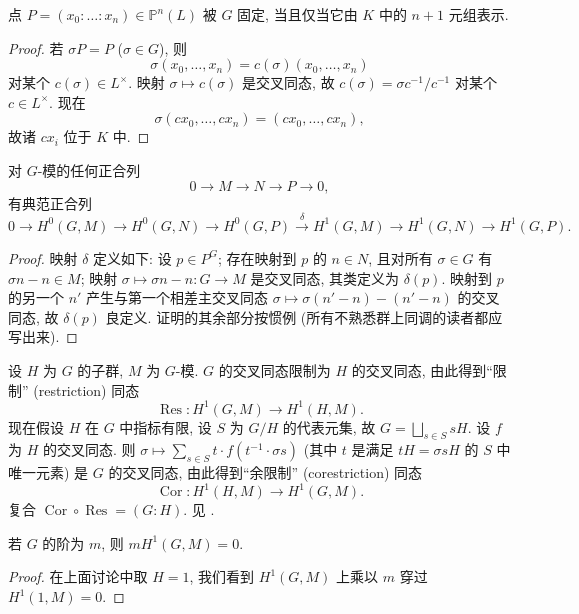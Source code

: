 \begin{corollary} \label{thm:4.1.4} 
点 $P = (x_0:\dots:x_n)\in\mathbb{P}^n(L)$ 被 $G$ 固定, 当且仅当它由 $K$ 中的 $n+1$ 元组表示.
\end{corollary}

\begin{proof}
若 $\sigma P = P$ ($\sigma\in G$), 则
\[
\sigma(x_0, \dots, x_n) = c(\sigma)(x_0, \dots, x_n)
\]
对某个 $c(\sigma)\in L^{\times}$. 映射 $\sigma\mapsto c(\sigma)$ 是交叉同态, 故 $c(\sigma) = \sigma c^{-1}/c^{-1}$ 对某个 $c\in L^{\times}$. 现在
\[
\sigma(cx_0, \dots, cx_n) = (cx_0, \dots, cx_n),
\]
故诸 $cx_i$ 位于 $K$ 中.
\end{proof}

\begin{proposition} \label{thm:4.1.5} 
对 $G$-模的任何正合列
\[
0\to M\to N\to P\to 0,
\]
有典范正合列
\[
0\to H^0(G, M)\to H^0(G, N)\to H^0(G, P)
\xrightarrow{\delta} H^1(G, M)\to H^1(G, N)\to H^1(G, P).
\]
\end{proposition}

\begin{proof}
映射 $\delta$ 定义如下: 设 $p\in P^G$; 存在映射到 $p$ 的 $n\in N$, 且对所有 $\sigma\in G$ 有 $\sigma n - n\in M$; 映射 $\sigma\mapsto\sigma n - n\colon G\to M$ 是交叉同态, 其类定义为 $\delta(p)$. 映射到 $p$ 的另一个 $n'$ 产生与第一个相差主交叉同态 $\sigma\mapsto\sigma(n'-n) - (n'-n)$ 的交叉同态, 故 $\delta(p)$ 良定义. 证明的其余部分按惯例 (所有不熟悉群上同调的读者都应写出来).
\end{proof}

设 $H$ 为 $G$ 的子群, $M$ 为 $G$-模. $G$ 的交叉同态限制为 $H$ 的交叉同态, 由此得到``限制'' (restriction) 同态
\[
\operatorname{Res}\colon H^1(G, M)\to H^1(H, M).
\]
现在假设 $H$ 在 $G$ 中指标有限, 设 $S$ 为 $G/H$ 的代表元集, 故 $G = \bigsqcup_{s\in S}sH$. 设 $f$ 为 $H$ 的交叉同态. 则 $\sigma\mapsto\sum_{s\in S}t\cdot f(t^{-1}\cdot\sigma s)$ (其中 $t$ 是满足 $tH = \sigma sH$ 的 $S$ 中唯一元素) 是 $G$ 的交叉同态, 由此得到``余限制'' (corestriction) 同态
\[
\operatorname{Cor}\colon H^1(H, M)\to H^1(G, M).
\]
复合 $\operatorname{Cor}\circ\operatorname{Res} = (G:H)$. 见 \cite[VIII, \S 2]{serre1979}.

\begin{proposition} \label{thm:4.1.6} 
若 $G$ 的阶为 $m$, 则 $mH^1(G, M) = 0$.
\end{proposition}

\begin{proof}
在上面讨论中取 $H = 1$, 我们看到 $H^1(G, M)$ 上乘以 $m$ 穿过 $H^1(1, M) = 0$.
\end{proof}

